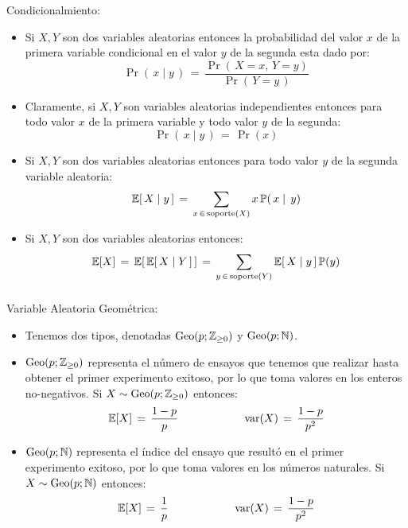 \documentclass[ 10pt, xcolor = dvipsnames]{beamer}
\begin{document}
\begin{frame}[allowframebreaks]
\frametitle{\insertsection}

Condicionalmiento: 
\begin{itemize}
\item Si $X,Y$ son dos variables aleatorias entonces la probabilidad del valor $x$ de la primera variable condicional en el valor $y$ de la segunda esta dado por: 
\[
\Pr( \, x \mid y \, ) \, = \, 
\frac{ \Pr( \, X = x, \, Y = y ) }{ \Pr( \, Y = y \, ) }
\]
\item Claramente, si $X,Y$ son variables aleatorias independientes entonces para todo valor $x$ de la primera variable y todo valor $y$ de la segunda: 
\[
\Pr( \, x \mid y \, ) \, = \, \Pr(x)
\]
\framebreak
\item Si $X,Y$ son dos variables aleatorias entonces para todo valor $y$ de la \linebreak segunda variable aleatoria: 
\[
\mathbb{E}[ \, X \mid y \, ] \, = \, \sum_{ x \, \in \, \text{soporte}(X) } x \, \mathbb{P}( \, x \mid \, y )
\]
\item Si $X,Y$ son dos variables aleatorias entonces: 
\[
\mathbb{E}[X] \, = \, \mathbb{E}[ \, \mathbb{E}[ \, X \mid Y \, ] \, ] \, = \, 
\sum_{ y \, \in \, \text{soporte}(Y) } \mathbb{E}[ \, X \mid y \, ] \, \mathbb{P}(y)
\]

\end{itemize}

\end{frame}

\begin{frame}[allowframebreaks]
\frametitle{\insertsection}

Variable Aleatoria Geom\'etrica:
\begin{itemize}
\item Tenemos dos tipos, denotadas $\text{Geo}(p;{\mathbb{Z}}_{\geq 0})$ y $\text{Geo}(p;\mathbb{N})$. 
\item $\text{Geo}(p;{\mathbb{Z}}_{\geq 0})$ representa el n\'umero de ensayos que tenemos que realizar \linebreak hasta obtener el primer experimento exitoso, por lo que toma valores en \linebreak los enteros no-negativos. Si $X \sim \text{Geo}(p;{\mathbb{Z}}_{\geq 0})$ entonces: 
\[
\mathbb{E}[X] \, = \, \frac{1-p}{p} \qquad \qquad \qquad
\text{var}(X) \, = \, \frac{1-p}{p^2}
\]
\item $\text{Geo}(p;\mathbb{N})$ representa el \'indice del ensayo que result\'o en el primer experimento exitoso, por lo que toma valores en los n\'umeros naturales. \linebreak Si $X \sim \text{Geo}(p;\mathbb{N})$ entonces: 
\[
\mathbb{E}[X] \, = \, \frac{1}{p} \qquad \qquad \qquad
\text{var}(X) \, = \, \frac{1-p}{p^2}
\]
\end{itemize}

\end{frame}
\end{document}
